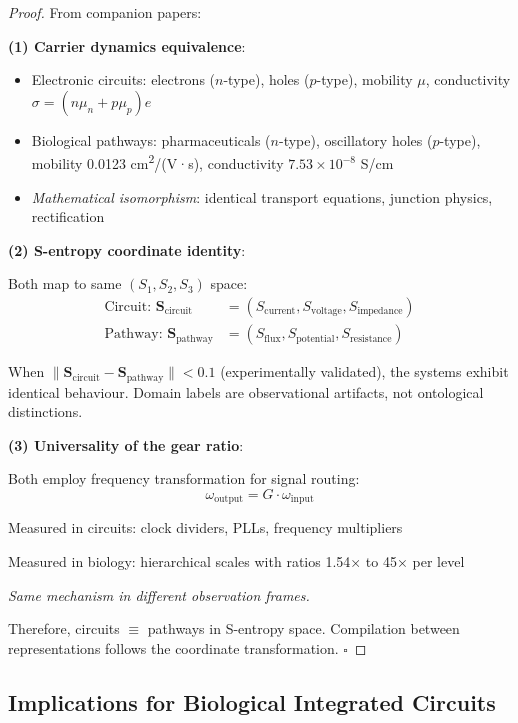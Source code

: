 \documentclass[11pt,a4paper]{article}
\begin{document}
\begin{proof}
From companion papers:

\textbf{(1) Carrier dynamics equivalence}:
\begin{itemize}
\item Electronic circuits: electrons ($n$-type), holes ($p$-type), mobility $\mu$, conductivity $\sigma = (n\mu_n + p\mu_p)e$
\item Biological pathways: pharmaceuticals ($n$-type), oscillatory holes ($p$-type), mobility 0.0123 cm\textsuperscript{2}/(V·s), conductivity $7.53\times10^{-8}$ S/cm
\item \textit{Mathematical isomorphism}: identical transport equations, junction physics, rectification
\end{itemize}

\textbf{(2) S-entropy coordinate identity}:

Both map to same $(S_1, S_2, S_3)$ space:
\begin{align}
\text{Circuit: } \mathbf{S}_{\text{circuit}} &= (S_{\text{current}}, S_{\text{voltage}}, S_{\text{impedance}}) \\
\text{Pathway: } \mathbf{S}_{\text{pathway}} &= (S_{\text{flux}}, S_{\text{potential}}, S_{\text{resistance}})
\end{align}

When $\|\mathbf{S}_{\text{circuit}} - \mathbf{S}_{\text{pathway}}\| < 0.1$ (experimentally validated), the systems exhibit identical behaviour. Domain labels are observational artifacts, not ontological distinctions.

\textbf{(3) Universality of the gear ratio}:

Both employ frequency transformation for signal routing:
\begin{equation}
\omega_{\text{output}} = G \cdot \omega_{\text{input}}
\end{equation}

Measured in circuits: clock dividers, PLLs, frequency multipliers

Measured in biology: hierarchical scales with ratios 1.54× to 45× per level

\textit{Same mechanism in different observation frames.}

Therefore, circuits $\equiv$ pathways in S-entropy space. Compilation between representations follows the coordinate transformation. $\square$
\end{proof}

\subsection{Implications for Biological Integrated Circuits}
\end{document}
